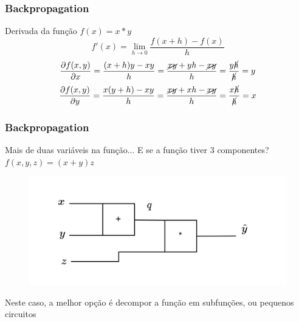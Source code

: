 \documentclass{beamer}
\begin{document}
\begin{frame}
	\frametitle{Backpropagation}
	\begin{example}
		Derivada da função $f(x) = x*y$ \\
		$$f'(x) = \lim_{h \rightarrow 0} \frac{f(x + h)-f(x)}{h}$$
		\renewcommand{\CancelColor}{\color{red}}
		$$\frac{\partial f(x,y)}{\partial x} = \frac{(x+h)y - xy}{h} = \frac{\cancel{xy} + yh - \cancel{ xy}}{h} = \frac{y\cancel{h}}{\cancel{h}} = y$$
		$$\frac{\partial f(x,y)}{\partial y} = \frac{x(y+h) - xy}{h} = \frac{\cancel{xy} + xh - \cancel{ xy}}{h} = \frac{x\cancel{h}}{\cancel{h}} = x$$
	\end{example}
\end{frame}
\begin{frame}
	\frametitle{Backpropagation}
	\begin{block}{Mais de duas variáveis na função...}
		E se a função tiver 3 componentes?
		$f(x,y,z) = (x+y)z$
		\begin{figure}
			\centering
			\includegraphics[width=0.7\linewidth]{figures/circuitxyz}
		\end{figure}
	Neste caso, a melhor opção é decompor a função em subfunções, ou pequenos circuitos
	\end{block}
\end{frame}
\end{document}
